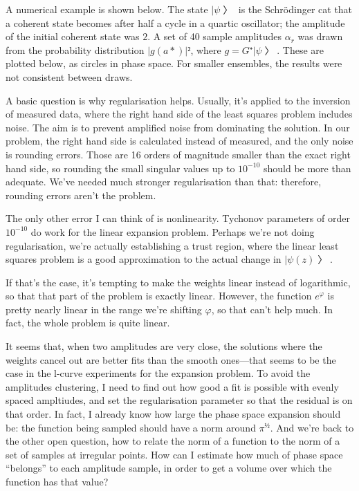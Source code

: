 A numerical example is shown below.  The state $|ψ〉$ is the Schrödinger cat that a coherent state becomes after half a cycle in a quartic oscillator; the amplitude of the initial coherent state was $2$.  A set of 40 sample amplitudes $α_r$ was drawn from the probability distribution $|g(a*)|²$, where $g=G⁺|ψ〉$.  These are plotted below, as circles in phase space.  For smaller ensembles, the results were not consistent between draws.

A basic question is why regularisation helps.  Usually, it's applied to the inversion of measured data, where the right hand side of the least squares problem includes noise.  The aim is to prevent amplified noise from dominating the solution.  In our problem, the right hand side is calculated instead of measured, and the only noise is rounding errors.  Those are 16 orders of magnitude smaller than the exact right hand side, so rounding the small singular values up to $10^{-10}$ should be more than adequate.  We've needed much stronger regularisation than that: therefore, rounding errors aren't the problem.

The only other error I can think of is nonlinearity.  Tychonov parameters of order $10^{-10}$ do work for the linear expansion problem.  Perhaps we're not doing regularisation, we're actually establishing a trust region, where the linear least squares problem is a good approximation to the actual change in $|ψ(z)〉$.

If that's the case, it's tempting to make the weights linear instead of logarithmic, so that that part of the problem is exactly linear.  However, the function $e^φ$ is pretty nearly linear in the range we're shifting $φ$, so that can't help much.  In fact, the whole problem is quite linear.

It seems that, when two amplitudes are very close, the solutions where the weights cancel out are better fits than the smooth ones—that seems to be the case in the l-curve experiments for the expansion problem.  To avoid the amplitudes clustering, I need to find out how good a fit is possible with evenly spaced ampltiudes, and set the regularisation parameter so that the residual is on that order.  In fact, I already know how large the phase space expansion should be: the function being sampled should have a norm around $π^½$.  And we're back to the other open question, how to relate the norm of a function to the norm of a set of samples at irregular points.  How can I estimate how much of phase space “belongs” to each amplitude sample, in order to get a volume over which the function has that value?

